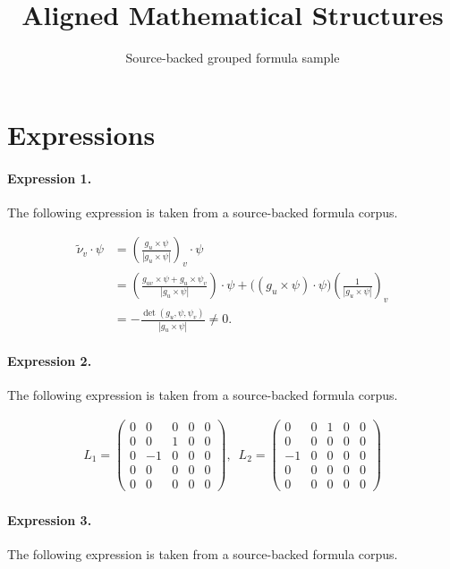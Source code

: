 \documentclass[11pt]{article}
\title{Aligned Mathematical Structures}
\author{Source-backed grouped formula sample}
\date{}
\begin{document}
\maketitle
\section{Expressions}
\paragraph{Expression 1.} The following expression is taken from a source-backed formula corpus.

\begin{align*} \tilde\nu_v\cdot \psi&= \left(\frac{g_u\times\psi}{|g_u\times\psi|}\right)_v \cdot \psi\\ &= \left(\frac{g_{uv}\times\psi+g_u\times\psi_v}{|g_u\times\psi|}\right) \cdot\psi + \bigl((g_u\times\psi)\cdot\psi\bigr)\left(\frac{1}{|g_u\times\psi|}\right)_v\\ &=-\frac{\det(g_u,\psi,\psi_v)}{|g_u\times\psi|}\neq 0. \end{align*}

\paragraph{Expression 2.} The following expression is taken from a source-backed formula corpus.

\begin{align*}L_1=\left( \begin{array}{ccccc}0 & 0 & 0 & 0 & 0 \\ 0 & 0 & 1 & 0 & 0 \\ 0 & -1 & 0 & 0 & 0 \\ 0 & 0 & 0 & 0 & 0 \\ 0 & 0 & 0 & 0 & 0\end{array}\right) ,\,\,\,L_2=\left( \begin{array}{ccccc}0 & 0 & 1 & 0 & 0 \\ 0 & 0 & 0 & 0 & 0 \\ -1 & 0 & 0 & 0 & 0 \\ 0 & 0 & 0 & 0 & 0 \\ 0 & 0 & 0 & 0 & 0\end{array}\right)\end{align*}

\paragraph{Expression 3.} The following expression is taken from a source-backed formula corpus.
\end{document}
